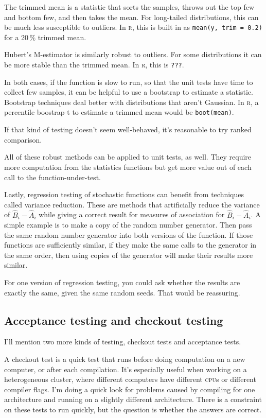 \documentclass[fleqn,10pt]{olplainarticle}
\newcommand{\rlang}{\textsc{r}\xspace}
\newcommand{\cpu}{\textsc{cpu}\xspace}
\begin{document}
The trimmed mean is a statistic that sorts the samples, throws out
the top few and bottom few, and then takes the mean. For long-tailed
distributions, this can be much less susceptible to outliers. In \rlang,
this is built in as \lstinline!mean(y, trim = 0.2)! for a 20\,\% trimmed mean.

Hubert's M-estimator is similarly robust to outliers. For some distributions
it can be more stable than the trimmed mean. In \rlang, this is \lstinline!???!.

In both cases, if the function is slow to run, so that the unit tests
have time to collect few samples, it can be helpful to use a bootstrap
to estimate a statistic. Bootstrap techniques deal better with distributions
that aren't Gaussian. In \rlang, a percentile boostrap-t to estimate
a trimmed mean would be \lstinline!boot(mean)!.

If that kind of testing doesn't seem well-behaved, it's reasonable
to try ranked comparison.

All of these robust methods can be applied to unit tests, as well.
They require more computation from the statistics functions but
get more value out of each call to the function-under-test.

Lastly, regression testing of stochastic functions can benefit from
techniques called variance reduction. These are methods that artificially
reduce the variance of $\hat{B}_i-\hat{A}_i$ while giving a correct
result for measures of association for $\hat{B}_i-\hat{A}_i$. A simple example
is to make a copy of the random number generator. Then pass the same
random number generator into both versions of the function. If those
functions are sufficiently similar, if they make the same calls to the
generator in the same order, then using copies of the generator will
make their results more similar.

For one version of regression testing, you could ask whether the results
are exactly the same, given the same random seeds. That would
be reassuring.


\subsection{Acceptance testing and checkout testing}

I'll mention two more kinds of testing, checkout tests and acceptance tests.

A checkout test is a quick test that runs before doing computation on a new
computer, or after each compilation. It's especially useful when working on
a heterogeneous cluster, where different computers have different \cpu{}s or
different compiler flags. I'm doing a quick look for problems caused by
compiling for one architecture and running on a slightly different architecture.
There is a constraint on these tests to run quickly, but the question is
whether the answers are correct.
\end{document}
